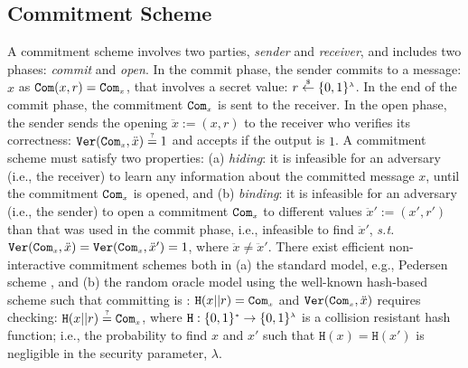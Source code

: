 



\subsection{Commitment Scheme}\label{subsec:commit}


 A commitment scheme involves two parties,  \emph{sender} and  \emph{receiver}, and includes  two phases: \emph{commit} and  \emph{open}. In the commit phase, the sender  commits to a message: $x$ as $\mathtt{Com}(x,r)=\mathtt{Com}_{\scriptscriptstyle x}$, that involves a secret value: $r\stackrel{\scriptscriptstyle\$}\leftarrow \{0,1\}^{\scriptscriptstyle\lambda}$. In the end of the commit phase,  the commitment $\mathtt{Com}_{\scriptscriptstyle x}$ is sent to the receiver. In the open phase, the sender sends the opening $\ddot{x}:=(x,r)$ to the receiver who verifies its correctness: $\mathtt{Ver}(\mathtt{Com}_{\scriptscriptstyle x},\ddot{x})\stackrel{\scriptscriptstyle ?}=1$ and accepts if the output is $1$.  A commitment scheme must satisfy two properties: (a) \textit{hiding}: it is infeasible for an adversary (i.e., the receiver) to learn any information about the committed  message $x$, until the commitment $\mathtt{Com}_{\scriptscriptstyle x}$ is opened, and (b) \textit{binding}: it is infeasible for an adversary (i.e., the sender) to open a commitment $\mathtt{Com}_{\scriptscriptstyle x}$ to different values $\ddot{x}':=(x',r')$ than that was  used in the commit phase, i.e., infeasible to find  $\ddot{x}'$, \textit{s.t.} $\mathtt{Ver}(\mathtt{Com}_{\scriptscriptstyle x},\ddot{x})=\mathtt{Ver}(\mathtt{Com}_{\scriptscriptstyle x},\ddot{x}')=1$, where $\ddot{x}\neq \ddot{x}'$.  There exist efficient non-interactive  commitment schemes both in (a) the standard model, e.g., Pedersen scheme \cite{Pedersen91}, and (b)  the random oracle model using the well-known hash-based scheme such that committing  is : $\mathtt{H}(x||r)=\mathtt{Com}_{\scriptscriptstyle x}$ and $\mathtt{Ver}(\mathtt{Com}_{\scriptscriptstyle x},\ddot{x})$ requires checking: $\mathtt{H}(x||r)\stackrel{\scriptscriptstyle ?}=\mathtt{Com}_{\scriptscriptstyle x}$, where $\mathtt{H}:\{0,1\}^{\scriptscriptstyle *}\rightarrow \{0,1\}^{\scriptscriptstyle\lambda}$ is a collision resistant hash function; i.e., the probability to find $x$ and $x'$ such that $\mathtt{H}(x)=\mathtt{H}(x')$ is negligible in the security parameter, $\lambda$.